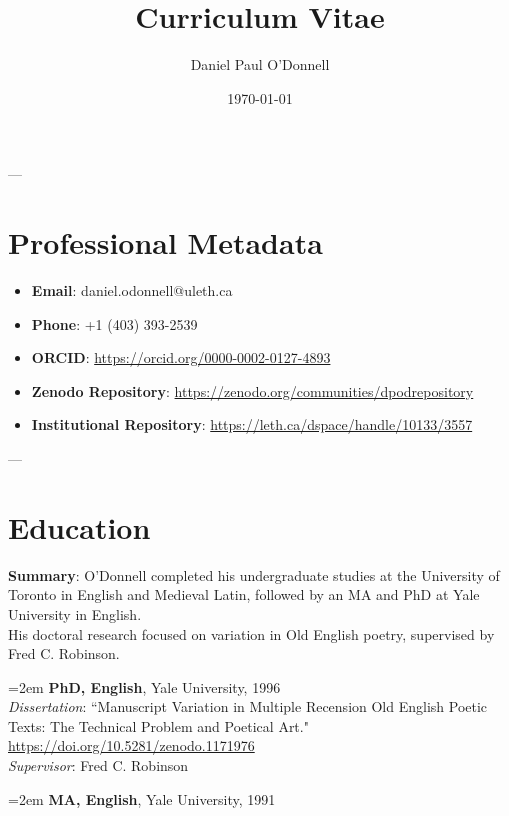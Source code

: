 \documentclass[12pt]{article}
\title{Curriculum Vitae}
\author{Daniel Paul O'Donnell}
\date{\today}
\begin{document}
\maketitle



---

\section*{Professional Metadata}
\begin{itemize}
  \item \textbf{Email}: daniel.odonnell@uleth.ca
  \item \textbf{Phone}: +1 (403) 393-2539
  \item \textbf{ORCID}: \url{https://orcid.org/0000-0002-0127-4893}
  \item \textbf{Zenodo Repository}: \url{https://zenodo.org/communities/dpodrepository}
  \item \textbf{Institutional Repository}: \url{https://leth.ca/dspace/handle/10133/3557}
\end{itemize}


---
\section*{Education}

\textbf{Summary}: O'Donnell completed his undergraduate studies at the University of Toronto in English and Medieval Latin, followed by an MA and PhD at Yale University in English.\\ His doctoral research focused on variation in Old English poetry, supervised by Fred C. Robinson.

\hangindent=2em
\textbf{PhD, English}, Yale University, 1996\\
\textit{Dissertation}: “Manuscript Variation in Multiple Recension Old English Poetic Texts: The Technical Problem and Poetical Art." \url{https://doi.org/10.5281/zenodo.1171976}\\
\textit{Supervisor}: Fred C. Robinson

\vspace{0.5em}
\hangindent=2em
\textbf{MA, English}, Yale University, 1991
\end{document}
